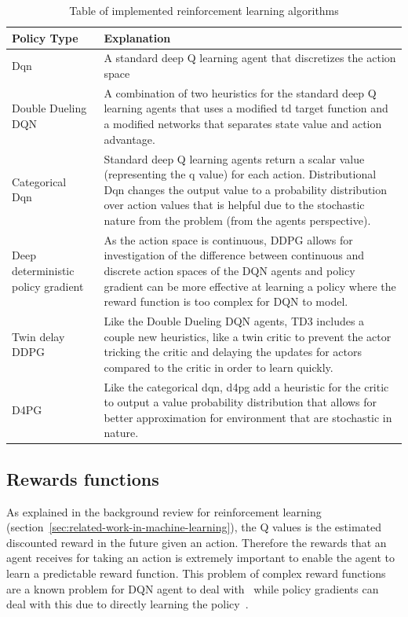 \begin{table}
    \centering
    \begin{tabular}{|p{3cm}|p{10cm}|} \hline
        Policy Type & Explanation \\ \hline
        Dqn~\citep{mnih2015humanlevel} & A standard deep Q learning agent that discretizes the action space \\ \hline
        Double Dueling DQN~\citep{doubledqn, duelingdqn} & A combination of two heuristics for the standard deep Q
            learning agents that uses a modified td target function and a modified networks that separates state value
            and action advantage. \\ \hline
        Categorical Dqn~\citep{distributional_dqn} & Standard deep Q learning agents return a scalar value
            (representing the q value) for each action. Distributional Dqn changes the output value to a probability
            distribution over action values that is helpful due to the stochastic nature from the problem (from the
            agents perspective). \\ \hline
        Deep deterministic policy gradient~\citep{ddpg} & As the action space is continuous, DDPG allows for
            investigation of the difference between continuous and discrete action spaces of the DQN agents and policy
            gradient can be more effective at learning a policy where the reward function is too complex for DQN to
            model. \\ \hline
        Twin delay DDPG~\citep{td3} & Like the Double Dueling DQN agents, TD3 includes a couple new heuristics, like a
            twin critic to prevent the actor tricking the critic and delaying the updates for actors compared to
            the critic in order to learn quickly.\\ \hline
        D4PG~\citep{d4pg} & Like the categorical dqn, d4pg add a heuristic for the critic to output a value probability
            distribution that allows for better approximation for environment that are stochastic in nature. \\ \hline
    \end{tabular}
    \caption{Table of implemented reinforcement learning algorithms}
    \label{tab:reinforcement_learning_algorithms}
\end{table}

\subsection{Rewards functions}\label{subsec:rewards-functions}
As explained in the background review for reinforcement learning (section~\ref{sec:related-work-in-machine-learning}),
the Q values is the estimated discounted reward in the future given an action. Therefore the
rewards that an agent receives for taking an action is extremely important to enable the agent to learn a predictable
reward function. This problem of complex reward functions are a known problem for DQN agent to deal with~\citep{atari} while policy gradients can
deal with this due to directly learning the policy~\citep{Sutton1998}.

